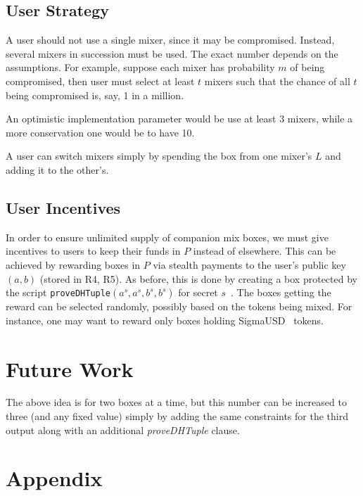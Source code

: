\documentclass[runningheads]{llncs}
\begin{document}
\subsection{User Strategy}

A user should not use a single mixer, since it may be compromised. Instead, several mixers in succession must be used.
The exact number depends on the assumptions.
For example, suppose each mixer has probability $m$ of being compromised, then user must select at least $t$ mixers such that the chance of all
$t$ being compromised is, say, 1 in a million.

An optimistic implementation parameter would be use at least 3 mixers, while a more conservation one would be to have 10.

A user can switch mixers simply by spending the box from one mixer's $L$ and adding it to the other's.

\subsection{User Incentives}

In order to ensure unlimited supply of companion mix boxes, we must give incentives to users to keep their funds in $P$ instead of elsewhere.
This can be achieved by rewarding boxes in $P$ via stealth payments to the user's public key $(a, b)$ (stored in R4, R5). As before, this is done by creating a box
protected by the script \texttt{proveDHTuple}$(a^s, a^s, b^s, b^s)$ for secret $s$~\cite{stealth-payments}.
The boxes getting the reward can be selected randomly, possibly based on the tokens being mixed. For instance, one may want to reward only boxes holding SigmaUSD~\cite{sigma-usd} tokens.


\section{Future Work}

The above idea is for two boxes at a time, but this number can be increased to three (and any fixed value) simply by adding the same constraints for the third output along with an additional {\em proveDHTuple} clause.




\appendix

\section*{Appendix}
\end{document}
